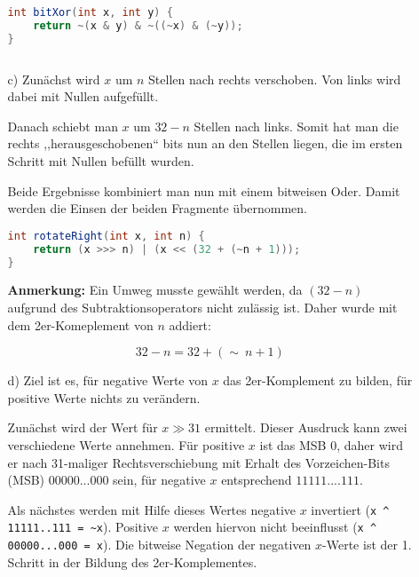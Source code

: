 \documentclass[a4paper,10pt]{scrartcl}
\begin{document}
\begin{enumerate}
\begin{enumerate}
                \begin{lstlisting}[language=java]
int bitXor(int x, int y) {
    return ~(x & y) & ~((~x) & (~y));
}
                \end{lstlisting}


                \begin{lstlisting}[language=java]

                \end{lstlisting}

            \item[c)]
                Zunächst wird $x$ um $n$ Stellen nach rechts verschoben. Von links wird dabei mit Nullen aufgefüllt.

                Danach schiebt man $x$ um $32 - n$ Stellen nach links. Somit hat man die rechts ,,herausgeschobenen`` bits
                nun an den Stellen liegen, die im ersten Schritt mit Nullen befüllt wurden.

                Beide Ergebnisse kombiniert man nun mit einem bitweisen Oder. Damit werden die Einsen der beiden
                Fragmente übernommen.

                \begin{lstlisting}[language=java]
int rotateRight(int x, int n) {
    return (x >>> n) | (x << (32 + (~n + 1)));
}
                \end{lstlisting}

                \textbf{Anmerkung:} Ein Umweg musste gewählt werden, da $(32 - n)$ aufgrund des Subtraktionsoperators
                nicht zulässig ist. Daher wurde mit dem 2er-Komeplement von $n$ addiert:

                $$32 - n = 32 + (\sim\ n + 1)$$

            \item[d)]
                Ziel ist es, für negative Werte von $x$ das 2er-Komplement zu bilden, für positive Werte nichts zu verändern.

                Zunächst wird der Wert für $x \gg 31$ ermittelt. Dieser Ausdruck kann zwei verschiedene
                Werte annehmen. Für positive $x$ ist das MSB $0$, daher wird er nach 31-maliger Rechtsverschiebung
                mit Erhalt des Vorzeichen-Bits (MSB) $00000...000$ sein, für negative $x$ entsprechend $11111....111$.

                Als nächstes werden mit Hilfe dieses Wertes negative $x$ invertiert (\lstinline|x ^ 11111..111 = ~x|). Positive
                $x$ werden hiervon nicht beeinflusst (\lstinline|x ^ 00000...000 = x|). Die bitweise Negation der negativen $x$-Werte
                ist der 1. Schritt in der Bildung des 2er-Komplementes.


\end{enumerate}
\end{enumerate}
\end{document}
